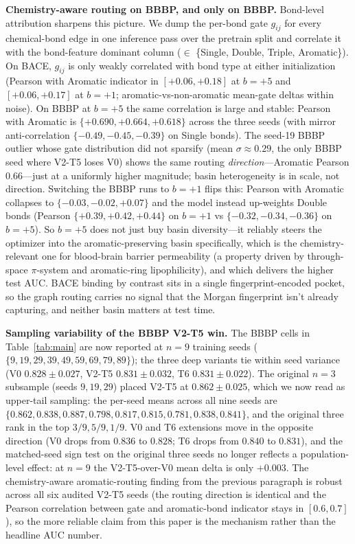 \documentclass[conference]{IEEEtran}
\begin{document}
\noindent\textbf{Chemistry-aware routing on BBBP, and only on BBBP.}
Bond-level attribution sharpens this picture. We dump the per-bond gate $g_{ij}$ for every chemical-bond edge in one inference pass over the pretrain split and correlate it with the bond-feature dominant column ($\in$ \{Single, Double, Triple, Aromatic\}). On BACE, $g_{ij}$ is only weakly correlated with bond type at either initialization (Pearson with Aromatic indicator in $[+0.06, +0.18]$ at $b{=}{+}5$ and $[+0.06, +0.17]$ at $b{=}{+}1$; aromatic-vs-non-aromatic mean-gate deltas within noise). On BBBP at $b{=}{+}5$ the same correlation is large and stable: Pearson with Aromatic is $\{+0.690, +0.664, +0.618\}$ across the three seeds (with mirror anti-correlation $\{-0.49, -0.45, -0.39\}$ on Single bonds). The seed-19 BBBP outlier whose gate distribution did not sparsify (mean $\sigma\approx 0.29$, the only BBBP seed where V2-T5 loses V0) shows the same routing \emph{direction}---Aromatic Pearson $0.66$---just at a uniformly higher magnitude; basin heterogeneity is in scale, not direction. Switching the BBBP runs to $b{=}{+}1$ flips this: Pearson with Aromatic collapses to $\{-0.03, -0.02, +0.07\}$ and the model instead up-weights Double bonds (Pearson $\{+0.39, +0.42, +0.44\}$ on $b{=}{+}1$ vs $\{-0.32, -0.34, -0.36\}$ on $b{=}{+}5$). So $b{=}{+}5$ does not just buy basin diversity---it reliably steers the optimizer into the aromatic-preserving basin specifically, which is the chemistry-relevant one for blood-brain barrier permeability (a property driven by through-space $\pi$-system and aromatic-ring lipophilicity), and which delivers the higher test AUC. BACE binding by contrast sits in a single fingerprint-encoded pocket, so the graph routing carries no signal that the Morgan fingerprint isn't already capturing, and neither basin matters at test time.

\noindent\textbf{Sampling variability of the BBBP V2-T5 win.}
The BBBP cells in Table~\ref{tab:main} are now reported at $n{=}9$ training seeds ($\{9, 19, 29, 39, 49, 59, 69, 79, 89\}$); the three deep variants tie within seed variance (V0 $0.828 \pm 0.027$, V2-T5 $0.831 \pm 0.032$, T6 $0.831 \pm 0.022$). The original $n{=}3$ subsample (seeds $9, 19, 29$) placed V2-T5 at $0.862 \pm 0.025$, which we now read as upper-tail sampling: the per-seed means across all nine seeds are $\{0.862, 0.838, 0.887, 0.798, 0.817, 0.815, 0.781, 0.838, 0.841\}$, and the original three rank in the top $3/9, 5/9, 1/9$. V0 and T6 extensions move in the opposite direction (V0 drops from $0.836$ to $0.828$; T6 drops from $0.840$ to $0.831$), and the matched-seed sign test on the original three seeds no longer reflects a population-level effect: at $n{=}9$ the V2-T5-over-V0 mean delta is only $+0.003$. The chemistry-aware aromatic-routing finding from the previous paragraph is robust across all six audited V2-T5 seeds (the routing direction is identical and the Pearson correlation between gate and aromatic-bond indicator stays in $[0.6, 0.7]$), so the more reliable claim from this paper is the mechanism rather than the headline AUC number.
\end{document}
